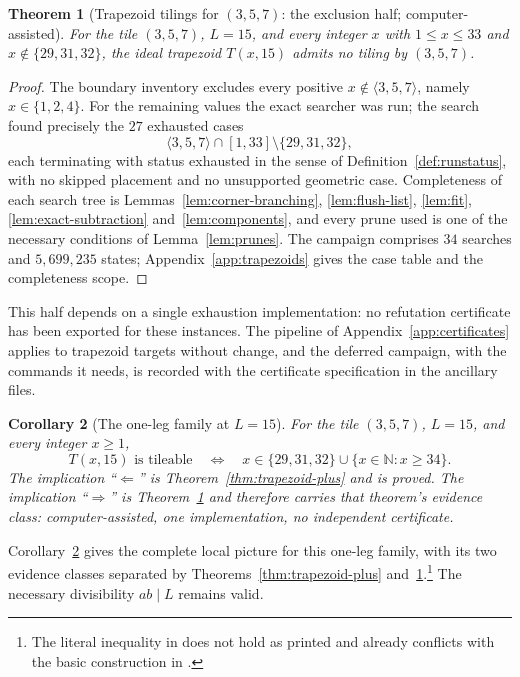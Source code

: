 \documentclass[11pt]{amsart}
\newtheorem{theorem}{Theorem}
\newtheorem{corollary}[theorem]{Corollary}
\theoremstyle{definition}
\theoremstyle{remark}
\newcommand{\N}{\mathbb N}
\begin{document}
\begin{theorem}[Trapezoid tilings for $(3,5,7)$: the exclusion half;
computer-assisted]\label{thm:trapezoid-minus}
For the tile $(3,5,7)$, $L=15$, and every integer $x$ with $1\le x\le33$ and
$x\notin\{29,31,32\}$, the ideal trapezoid $T(x,15)$ admits no tiling by
$(3,5,7)$.
\end{theorem}

\begin{proof}
The boundary inventory excludes every positive $x\notin\langle3,5,7\rangle$,
namely $x\in\{1,2,4\}$.  For the remaining values the exact searcher was
run; the search found precisely the $27$ exhausted cases
\[
 \langle3,5,7\rangle\cap[1,33]\setminus\{29,31,32\},
\]
each terminating with status exhausted in the sense of
Definition~\ref{def:runstatus}, with no skipped placement and no unsupported
geometric case.  Completeness of each search tree is
Lemmas~\ref{lem:corner-branching}, \ref{lem:flush-list}, \ref{lem:fit},
\ref{lem:exact-subtraction} and~\ref{lem:components}, and every prune used
is one of the necessary conditions of Lemma~\ref{lem:prunes}.  The campaign
comprises $34$ searches and $5{,}699{,}235$ states;
Appendix~\ref{app:trapezoids} gives the case table and the completeness
scope.
\end{proof}

\noindent
This half depends on a single exhaustion implementation: no refutation
certificate has been exported for these instances.  The pipeline of
Appendix~\ref{app:certificates} applies to trapezoid targets without change,
and the deferred campaign, with the commands it needs, is recorded with the
certificate specification in the ancillary files.

\begin{corollary}[The one-leg family at $L=15$]\label{cor:trapezoid357}
For the tile $(3,5,7)$, $L=15$, and every integer $x\ge1$,
\[
 T(x,15)\text{ is tileable}
 \quad\Longleftrightarrow\quad
 x\in\{29,31,32\}\cup\{x\in\N:x\ge34\}.
\]
The implication ``$\Leftarrow$'' is Theorem~\ref{thm:trapezoid-plus} and is
proved.  The implication ``$\Rightarrow$'' is
Theorem~\ref{thm:trapezoid-minus} and therefore carries that theorem's
evidence class: computer-assisted, one implementation, no independent
certificate.
\end{corollary}

Corollary~\ref{cor:trapezoid357} gives the complete local picture for this
one-leg family, with its two evidence classes separated by
Theorems~\ref{thm:trapezoid-plus} and~\ref{thm:trapezoid-minus}.\footnote{The
literal inequality in \cite[Conjecture~5]{Zhang25} does not hold as printed
and already conflicts with the basic construction in
\cite[Lemma~1]{Zhang25}.}  The necessary divisibility $ab\mid L$ remains
valid.
\end{document}
